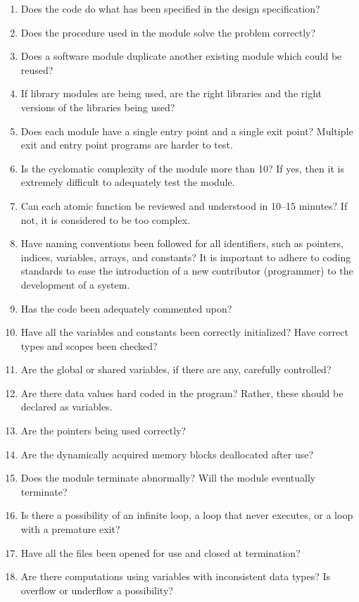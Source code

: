 \begin{enumerate}[nosep]
    \item Does the code do what has been specified in the design specification?
    \item Does the procedure used in the module solve the problem correctly?
    \item Does a software module duplicate another existing module which could be reused?
    \item If library modules are being used, are the right libraries and the right versions of the libraries being used?
    \item Does each module have a single entry point and a single exit point? Multiple exit and entry point programs are harder to test.
    \item Is the cyclomatic complexity of the module more than 10? If yes, then it is extremely difficult to adequately test the module.
    \item Can each atomic function be reviewed and understood in 10–15 minutes? If not, it is considered to be too complex.
    \item Have naming conventions been followed for all identifiers, such as pointers, indices, variables, arrays, and constants? It is important to adhere to coding standards to ease the introduction of a new contributor (programmer) to the development of a system.
    \item Has the code been adequately commented upon?
    \item Have all the variables and constants been correctly initialized? Have correct types and scopes been checked?
    \item Are the global or shared variables, if there are any, carefully controlled?
    \item Are there data values hard coded in the program? Rather, these should be declared as variables.
    \item Are the pointers being used correctly?
    \item Are the dynamically acquired memory blocks deallocated after use?
    \item Does the module terminate abnormally? Will the module eventually terminate?
    \item Is there a possibility of an infinite loop, a loop that never executes, or a loop with a premature exit?
    \item Have all the files been opened for use and closed at termination?
    \item Are there computations using variables with inconsistent data types? Is overflow or underflow a possibility?

\end{enumerate}
